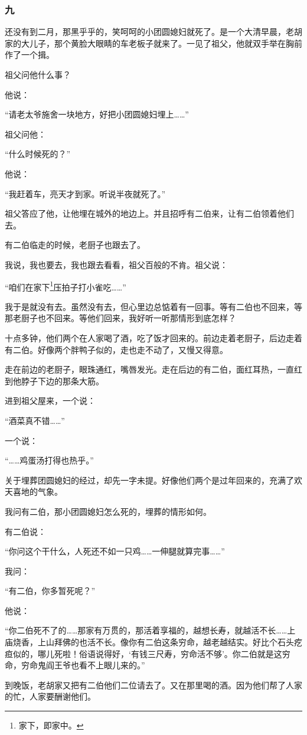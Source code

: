 \subsubsection*{九}
\par 还没有到二月，那黑乎乎的，笑呵呵的小团圆媳妇就死了。是一个大清早晨，老胡家的大儿子，那个黄脸大眼睛的车老板子就来了。一见了祖父，他就双手举在胸前作了一个揖。
\par 祖父问他什么事？
\par 他说：
\par “请老太爷施舍一块地方，好把小团圆媳妇埋上……”
\par 祖父问他：
\par “什么时候死的？”
\par 他说：
\par “我赶着车，亮天才到家。听说半夜就死了。”
\par 祖父答应了他，让他埋在城外的地边上。并且招呼有二伯来，让有二伯领着他们去。
\par 有二伯临走的时候，老厨子也跟去了。
\par 我说，我也要去，我也跟去看看，祖父百般的不肯。祖父说：
\par “咱们在家下\footnote{家下，即家中。}压拍子打小雀吃……”
\par 我于是就没有去。虽然没有去，但心里边总惦着有一回事。等有二伯也不回来，等那老厨子也不回来。等他们回来，我好听一听那情形到底怎样？
\par 十点多钟，他们两个在人家喝了酒，吃了饭才回来的。前边走着老厨子，后边走着有二伯。好像两个胖鸭子似的，走也走不动了，又慢又得意。
\par 走在前边的老厨子，眼珠通红，嘴唇发光。走在后边的有二伯，面红耳热，一直红到他脖子下边的那条大筋。
\par 进到祖父屋来，一个说：
\par “酒菜真不错……”
\par 一个说：
\par “……鸡蛋汤打得也热乎。”
\par 关于埋葬团圆媳妇的经过，却先一字未提。好像他们两个是过年回来的，充满了欢天喜地的气象。
\par 我问有二伯，那小团圆媳妇怎么死的，埋葬的情形如何。
\par 有二伯说：
\par “你问这个干什么，人死还不如一只鸡……一伸腿就算完事……”
\par 我问：
\par “有二伯，你多暂死呢？”
\par 他说：
\par “你二伯死不了的……那家有万贯的，那活着享福的，越想长寿，就越活不长……上庙烧香，上山拜佛的也活不长。像你有二伯这条穷命，越老越结实。好比个石头疙疸似的，哪儿死啦！俗语说得好，‘有钱三尺寿，穷命活不够’。你二伯就是这穷命，穷命鬼阎王爷也看不上眼儿来的。”
\par 到晚饭，老胡家又把有二伯他们二位请去了。又在那里喝的酒。因为他们帮了人家的忙，人家要酬谢他们。
